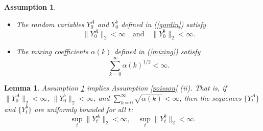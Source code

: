 \documentclass[11pt]{article}
\newtheorem{assumption}{Assumption}
\newtheorem{lemma}{Lemma}
\begin{document}
\begin{assumption}\label{mixing_assmp}
\begin{itemize}
\item[i.] The random variables $Y_0^A$ and $Y_0^b$ defined in (\ref{gordin}) satisfy
\[
\|Y_0^A\|_2 < \infty \quad \text{and} \quad \|Y_0^b\|_2 < \infty.
\]
\item[ii.] The mixing coefficients $\alpha(k)$ defined in (\ref{mixing}) satisfy
\[
\sum_{k=0}^\infty \alpha(k)^{1/2} < \infty.
\]
\end{itemize}
\end{assumption}

\begin{lemma}
Assumption \ref{mixing_assmp} implies Assumption \ref{poisson} (ii). That is, if $\|Y_0^A\|_2 < \infty$, $\|Y_0^b\|_2 < \infty$, and $\sum_{k=0}^\infty \sqrt{\alpha(k)} < \infty$, then the sequences $\{Y^A_t\}$ and $\{Y^b_t\}$ are uniformly bounded for all $t$:
\[
\sup_t \|Y^A_t\|_2 < \infty, \quad \sup_t \|Y^b_t\|_2 < \infty.
\]
\end{lemma}
\end{document}
